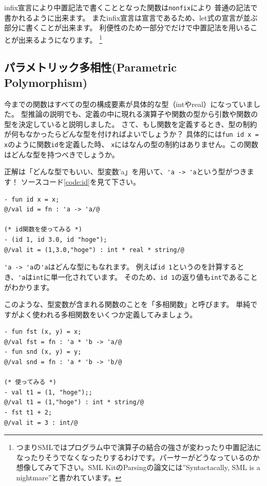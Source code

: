 \documentclass[11pt,a4paper]{article}
\begin{document}
infix宣言により中置記法で書くこととなった関数は\lstinline{nonfix}により
普通の記法で書かれるように出来ます。
またinfix宣言は宣言であるため、let式の宣言が並ぶ部分に書くことが出来ます。
利便性のため一部分でだけで中置記法を用いることが出来るようになります。
\footnote{つまりSMLではプログラム中で演算子の結合の強さが変わったり中置記法になったりそうでなくなったりするわけです。パーサーがどうなっているのか想像してみて下さい。SML KitのParsingの論文には''Syntactacally, SML is a nightmare''\cite{SML-KIT}と書かれています。}

\subsection{パラメトリック多相性(Parametric Polymorphism)}

今までの関数はすべての型の構成要素が具体的な型（intやreal）になっていました。
型推論の説明でも、定義の中に現れる演算子や関数の型から引数や関数の型を決定していると説明しました。
さて、もし関数を定義するとき、型の制約が何もなかったらどんな型を付ければよいでしょうか？
具体的には\lstinline{fun id x = x}のように関数\lstinline{id}を定義した時、
\lstinline{x}にはなんの型の制約はありません。この関数はどんな型を持つべきでしょうか。

正解は「どんな型でもいい、型変数'a」を用いて、\lstinline{'a -> 'a}という型がつきます！
ソースコード\ref{code:id}を見て下さい。

\begin{lstlisting}[caption=多相関数,label=code:id]
- fun id x = x;
@/val id = fn : 'a -> 'a/@

(* id関数を使ってみる *)
- (id 1, id 3.0, id "hoge");
@/val it = (1,3.0,"hoge") : int * real * string/@
\end{lstlisting}

\lstinline{'a -> 'a}の\lstinline{'a}はどんな型にもなれます。
例えば\lstinline{id 1}というのを計算するとき、\lstinline{'a}は\lstinline{int}に単一化されています。
そのため、\lstinline{id 1}の返り値も\lstinline{int}であることがわかります。

このような、型変数が含まれる関数のことを「多相関数」と呼びます。
単純ですがよく使われる多相関数をいくつか定義してみましょう。

\begin{lstlisting}[caption=多相関数たち,label=code:poly]
- fun fst (x, y) = x;
@/val fst = fn : 'a * 'b -> 'a/@
- fun snd (x, y) = y;
@/val snd = fn : 'a * 'b -> 'b/@

(* 使ってみる *)
- val t1 = (1, "hoge");;
@/val t1 = (1,"hoge") : int * string/@
- fst t1 + 2;
@/val it = 3 : int/@
\end{lstlisting}
\end{document}
